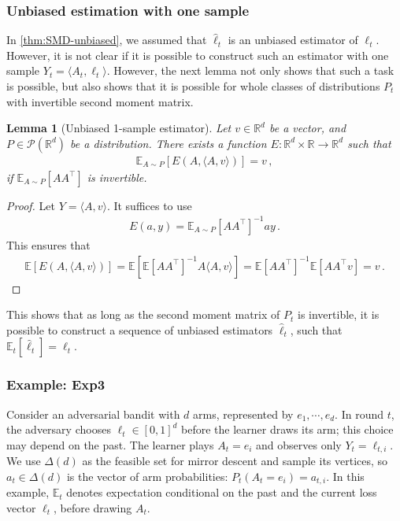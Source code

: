 \documentclass{article}
\theoremstyle{plain}
\newtheorem{lemma}[theorem]{Lemma}
\theoremstyle{definition}
\newcommand{\R}{\mathbb R}
\newcommand{\Rd}{\mathbb{R}^d}
\newcommand{\E}{\mathbb E}
\newcommand{\cP}{\mathcal P}
\newcommand{\expthree}{\textsf{Exp3}\xspace}
\newcommand{\hl}{\hat{\ell}\xspace}
\begin{document}
\subsubsection{Unbiased estimation with one sample}
In \cref{thm:SMD-unbiased}, we assumed that $\hl_t$ is an unbiased estimator of $\ell_t$.
However, it is not clear if it is possible to construct such an estimator
with one sample $Y_t = \langle A_t, \ell_t \rangle$.
However, the next lemma not only shows that such a task is possible,
but also shows that it is possible for whole classes of distributions
$P_t$ with invertible second moment matrix.
\begin{lemma}[Unbiased 1-sample estimator]
    \label{lem:1-sample-estimator}
    Let $v \in \R^d$ be a vector,
    and $P \in \cP(\Rd)$ be a distribution.
    There exists a function $E: \Rd \times \R \to \Rd$ such that
    \begin{align*}
        \E_{A \sim P}[E(A, \langle A, v \rangle)] = v\,,
    \end{align*}
    if $\E_{A \sim P}[A A^\top]$ is invertible.
\end{lemma}
\begin{proof}
    Let $Y = \langle A, v \rangle$.
    It suffices to use
    \begin{align*}
        E(a, y) = \E_{A \sim P}[A A^\top]^{-1} a  y\,.
    \end{align*}
    This ensures that
    \begin{align*}
        \E[E(A, \langle A, v \rangle)]
        = \E[\E[A A^\top]^{-1} A  \langle A, v \rangle]
        = \E[A A^\top]^{-1} \E[A  A^\top v]
        = v\,.
    \end{align*}
\end{proof}
This shows that as long as the second moment matrix of $P_t$ is invertible,
it is possible to construct a sequence of unbiased estimators $\hl_t$,
such that $\E_t[\hl_t] = \ell_t$.

\subsubsection{Example: \expthree}
Consider an adversarial bandit with $d$ arms, represented by
$e_1, \cdots, e_d$.
In round $t$, the adversary chooses $\ell_t \in [0,1]^d$ before the learner
draws its arm; this choice may depend on the past.
The learner plays $A_t=e_i$ and observes only $Y_t=\ell_{t,i}$.
We use $\Delta(d)$ as the feasible set for mirror descent and sample its
vertices, so $a_t \in \Delta(d)$ is the vector of arm probabilities:
$P_t(A_t=e_i)=a_{t,i}$.
In this example, $\E_t$ denotes expectation conditional on the past and
the current loss vector $\ell_t$, before drawing $A_t$.
\end{document}
